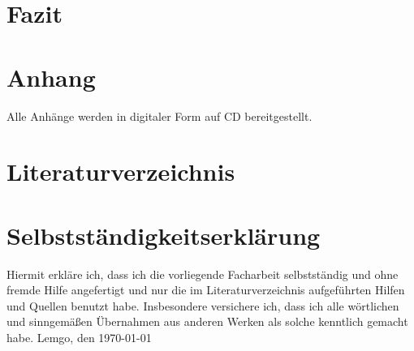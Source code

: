 \documentclass[a4paper,12pt,titlepage,ngerman]{article}
\begin{document}
\begin{sloppypar}
  \section{Fazit}\label{sec:Conclusion}
  \section{Anhang}\label{sec:anhang}
  Alle Anhänge werden in digitaler Form auf CD bereitgestellt.
  \section{Literaturverzeichnis}\label{sec:Literature}
  \printbibliography[heading=none]
  \section{Selbstständigkeitserklärung}\label{sec:IDidThisMyself}
  Hiermit erkläre ich, dass ich die vorliegende Facharbeit selbstständig und ohne fremde Hilfe angefertigt und nur die im Literaturverzeichnis
  aufgeführten Hilfen und Quellen benutzt habe.
  Insbesondere versichere ich, dass ich alle wörtlichen
  und sinngemä\ss en Übernahmen aus anderen Werken als solche kenntlich gemacht habe.
  \medbreak
  Lemgo, den \today
  \medbreak
 \end{sloppypar}
\end{document}
